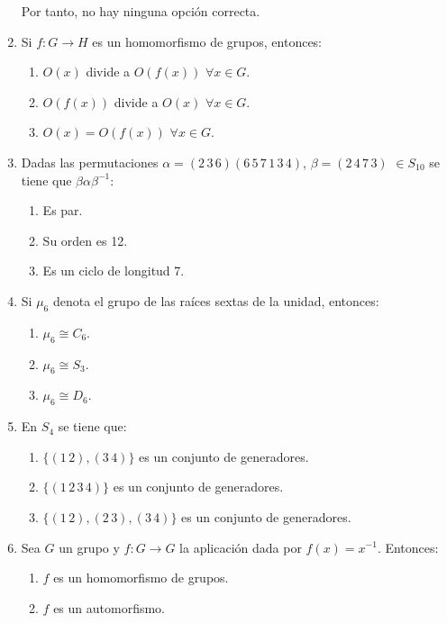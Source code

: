 \documentclass[12pt]{article}
\begin{document}
\begin{ejercicio}
\begin{enumerate}
            Por tanto, no hay ninguna opción correcta.
            \item Si $f : G \to H$ es un homomorfismo de grupos, entonces:
            \begin{enumerate}
                \item $O(x)$ divide a $O(f(x))$ $\forall x \in G$.
                \item $O(f(x))$ divide a $O(x)$ $\forall x \in G$.
                \item $O(x) = O(f(x))$ $\forall x \in G$.
            \end{enumerate}
            \item Dadas las permutaciones $\alpha = (2\,3\,6)(6\,5\,7\,1\,3\,4)$, $\beta = (2\,4\,7\,3)$ $\in S_{10}$ se tiene que $\beta\alpha\beta^{-1}$:
            \begin{enumerate}
                \item Es par.
                \item Su orden es 12.
                \item Es un ciclo de longitud 7.
            \end{enumerate}
            \item Si $\mu_6$ denota el grupo de las raíces sextas de la unidad, entonces:
            \begin{enumerate}
                \item $\mu_6 \cong C_6$.
                \item $\mu_6 \cong S_3$.
                \item $\mu_6 \cong D_6$.
            \end{enumerate}
            \item En $S_4$ se tiene que:
            \begin{enumerate}
                \item $\{(1\,2),(3\,4)\}$ es un conjunto de generadores.
                \item $\{(1\,2\,3\,4)\}$ es un conjunto de generadores.
                \item $\{(1\,2),(2\,3),(3\,4)\}$ es un conjunto de generadores.
            \end{enumerate}
            \item Sea $G$ un grupo y $f : G \to G$ la aplicación dada por $f(x) = x^{-1}$. Entonces:
            \begin{enumerate}
                \item $f$ es un homomorfismo de grupos.
                \item $f$ es un automorfismo.

\end{enumerate}
\end{enumerate}
\end{ejercicio}
\end{document}
